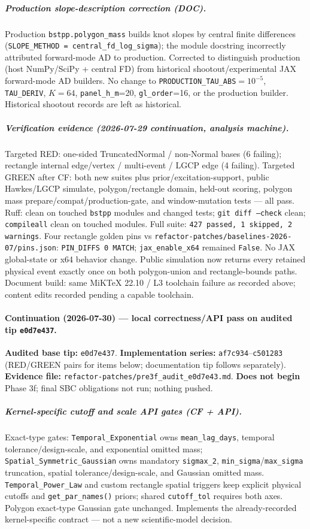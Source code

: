 \documentclass[
  10pt,
]{article}
\begin{document}
\subparagraph{Production slope-description correction (DOC).}
Production \texttt{bstpp.polygon\_mass} builds knot slopes by central finite differences (\texttt{SLOPE\_METHOD = central\_fd\_log\_sigma}); the module docstring incorrectly attributed forward-mode AD to production.
Corrected to distinguish production (host NumPy/SciPy + central FD) from historical shootout/experimental JAX forward-mode AD builders.
No change to \texttt{PRODUCTION\_TAU\_ABS}\(=10^{-5}\), \texttt{TAU\_DERIV}, \(K{=}64\), \texttt{panel\_h\_m}=20, \texttt{gl\_order}=16, or the production builder.
Historical shootout records are left as historical.

\subparagraph{Verification evidence (2026-07-29 continuation, analysis machine).}
Targeted RED: one-sided TruncatedNormal / non-Normal bases (6 failing); rectangle internal edge/vertex / multi-event / LGCP edge (4 failing).
Targeted GREEN after CF: both new suites plus prior/excitation-support, public Hawkes/LGCP simulate, polygon/rectangle domain, held-out scoring, polygon mass prepare/compat/production-gate, and window-mutation tests --- all pass.
Ruff: clean on touched \texttt{bstpp} modules and changed tests; \texttt{git diff --check} clean; \texttt{compileall} clean on touched modules.
Full suite: \texttt{427 passed, 1 skipped, 2 warnings}.
Four rectangle golden pins vs \texttt{refactor-patches/baselines-2026-07/pins.json}: \texttt{PIN\_DIFFS 0 MATCH}; \texttt{jax\_enable\_x64} remained \texttt{False}.
No JAX global-state or x64 behavior change.
Public simulation now returns every retained physical event exactly once on both polygon-union and rectangle-bounds paths.
Document build: same MiKTeX 22.10 / L3 toolchain failure as recorded above; content edits recorded pending a capable toolchain.


\paragraph{Continuation (2026-07-30) --- local correctness/API pass on audited tip \texttt{e0d7e437}.}
\textbf{Audited base tip:} \texttt{e0d7e437}.
\textbf{Implementation series:} \texttt{af7c934}--\texttt{c501283} (RED/GREEN pairs for items below; documentation tip follows separately).
\textbf{Evidence file:} \texttt{refactor-patches/pre3f\_audit\_e0d7e43.md}.
\textbf{Does not begin} Phase 3f; final SBC obligations not run; nothing pushed.

\subparagraph{Kernel-specific cutoff and scale API gates (CF + API).}
Exact-type gates: \texttt{Temporal\_Exponential} owns \texttt{mean\_lag\_days}, temporal tolerance/design-scale, and exponential omitted mass; \texttt{Spatial\_Symmetric\_Gaussian} owns mandatory \texttt{sigmax\_2}, \texttt{min\_sigma}/\texttt{max\_sigma} truncation, spatial tolerance/design-scale, and Gaussian omitted mass.
\texttt{Temporal\_Power\_Law} and custom rectangle spatial triggers keep explicit physical cutoffs and \texttt{get\_par\_names()} priors; shared \texttt{cutoff\_tol} requires both axes.
Polygon exact-type Gaussian gate unchanged.
Implements the already-recorded kernel-specific contract --- not a new scientific-model decision.
\end{document}
